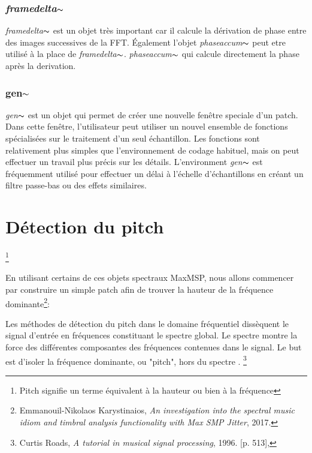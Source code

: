\subsubsection{\textit{framedelta}$\thicksim$}
    
    \textit{framedelta}$\thicksim$ est un objet très important car il calcule la dérivation de phase entre des images successives de la FFT. Également l'objet \textit{phaseaccum}$\thicksim$ peut etre utilisé à la place de \textit{framedelta}$\thicksim$. \textit{phaseaccum}$\thicksim$ qui calcule directement la phase après la derivation.

\subsubsection{gen$\thicksim$}
    
    \textit{gen}$\thicksim$ est un objet qui permet de créer une nouvelle fenêtre speciale d’un patch. Dans cette fenêtre, l'utilisateur peut utiliser un nouvel ensemble de fonctions spécialisées sur le traitement d'un seul échantillon. Les fonctions sont relativement plus simples que l'environnement de codage habituel, mais on peut effectuer un travail plus précis sur les détails. L’environment \textit{gen}$ \thicksim $ est fréquemment utilisé pour effectuer un délai à l'échelle d'échantillons en créant un filtre passe-bas ou des effets similaires.

\section{Détection du pitch}\footnote{Pitch signifie un terme équivalent à la hauteur ou bien à la fréquence}

En utilisant certains de ces objets spectraux MaxMSP, nous allons commencer par construire un simple patch afin de trouver la hauteur de la fréquence dominante\footnote{Emmanouil-Nikolaos Karystinaios, \textit{An investigation into the spectral music idiom and timbral analysis functionality with Max SMP Jitter}, 2017. \nocite{Kar17}}:

     \begin{displayquote}
         \guillemotleft Les méthodes de détection du pitch dans le domaine fréquentiel dissèquent le signal d'entrée en fréquences constituant le spectre global. Le spectre montre la force des différentes composantes des fréquences contenues dans le signal. Le but est d’isoler la fréquence dominante, ou "pitch", hors du spectre \guillemotright. \footnote{Curtis Roads, \textit{A tutorial in musical signal processing}, 1996. [p. 513], \nocite{Roads1996}}
     \end{displayquote}


